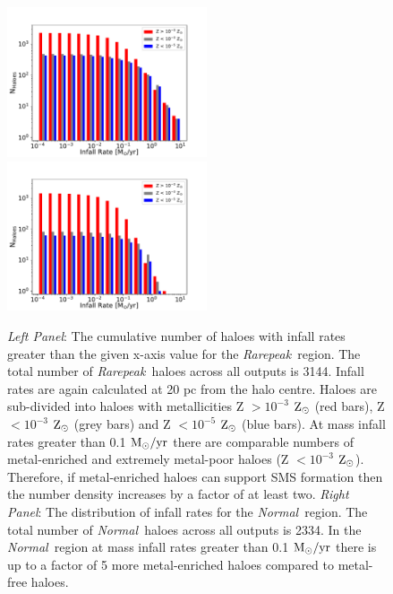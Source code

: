 \documentclass[graphics, twocolumn, usenatbib]{mn2e}
\newcommand{\msolaryr} {$\rm{M_{\odot}/yr}~$}
\newcommand{\zsolar} {$\rm{Z_{\odot}}~$}
\newcommand{\zsolarc} {$\rm{Z_{\odot}}$}
\newcommand{\rarepeak} {\textit{Rarepeak~}}
\newcommand{\normal} {\textit{Normal~}}
\begin{document}
\begin{figure}
\centering
\begin{minipage}{175mm}      \begin{center} 
\centerline{
\includegraphics[width=0.525\textwidth]{FIGURES/Rarepeak_NHaloes.pdf}
\includegraphics[width=0.525\textwidth]{FIGURES/Normal_NHaloes.pdf}}
\caption{\textit{Left Panel}: The cumulative number of haloes with infall rates greater than the given
  x-axis value for the \rarepeak region.  The total number of \rarepeak haloes across all outputs
  is 3144. Infall rates are again calculated at 20 pc from the halo centre.
  Haloes are sub-divided into haloes with metallicities Z $> 10^{-3}$ \zsolar (red bars),
  Z $< 10^{-3}$ \zsolar (grey bars) and  Z $< 10^{-5}$ \zsolar (blue bars). At mass infall
  rates greater than 0.1 \msolaryr there are comparable numbers of metal-enriched and extremely
  metal-poor haloes (Z $< 10^{-3}$ \zsolarc). Therefore, if metal-enriched haloes can support SMS
  formation then the number density increases by a factor of at least two. 
  \textit{Right Panel}: The distribution of
  infall rates for the \normal region. The  total number of \normal haloes across all outputs is 2334.
  In the \normal region at mass infall
  rates greater than 0.1 \msolaryr there is up to a factor of 5 more metal-enriched haloes compared to
  metal-free haloes. 
 } \label{Fig:Histogram}
\end{center} \end{minipage}

\end{figure}
\end{document}
